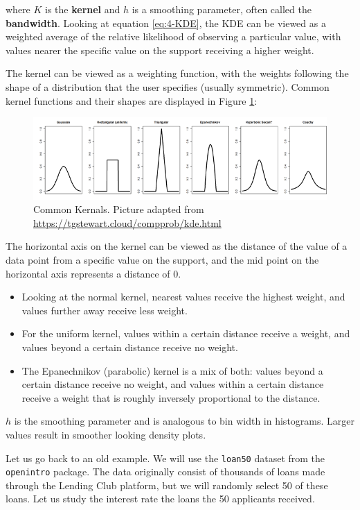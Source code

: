 \documentclass[
]{book}
\providecommand{\tightlist}{%
  \setlength{\itemsep}{0pt}\setlength{\parskip}{0pt}}
\begin{document}
where \(K\) is the \textbf{kernel} and \(h\) is a smoothing parameter, often called the \textbf{bandwidth}. Looking at equation \eqref{eq:4-KDE}, the KDE can be viewed as a weighted average of the relative likelihood of observing a particular value, with values nearer the specific value on the support receiving a higher weight.

The kernel can be viewed as a weighting function, with the weights following the shape of a distribution that the user specifies (usually symmetric). Common kernel functions and their shapes are displayed in Figure \ref{fig:4-KDE}:

\begin{figure}
\centering
\includegraphics{images/04-KDE.png}
\caption{\label{fig:4-KDE}Common Kernals. Picture adapted from \url{https://tgstewart.cloud/compprob/kde.html}}
\end{figure}

The horizontal axis on the kernel can be viewed as the distance of the value of a data point from a specific value on the support, and the mid point on the horizontal axis represents a distance of 0.

\begin{itemize}
\tightlist
\item
  Looking at the normal kernel, nearest values receive the highest weight, and values further away receive less weight.
\item
  For the uniform kernel, values within a certain distance receive a weight, and values beyond a certain distance receive no weight.
\item
  The Epanechnikov (parabolic) kernel is a mix of both: values beyond a certain distance receive no weight, and values within a certain distance receive a weight that is roughly inversely proportional to the distance.
\end{itemize}

\(h\) is the smoothing parameter and is analogous to bin width in histograms. Larger values result in smoother looking density plots.

Let us go back to an old example. We will use the \texttt{loan50} dataset from the \texttt{openintro} package. The data originally consist of thousands of loans made through the Lending Club platform, but we will randomly select 50 of these loans. Let us study the interest rate the loans the 50 applicants received.
\end{document}

